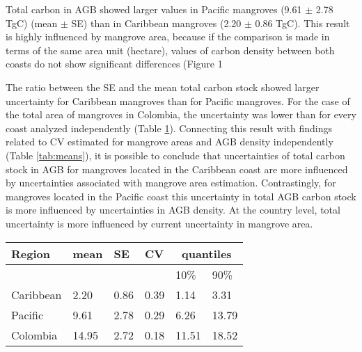\documentclass[review, authoryear]{elsarticle}   	%
\begin{document}
Total carbon in AGB showed larger values in Pacific mangroves (9.61 $\pm$ 2.78 TgC) (mean $\pm$ SE) than in Caribbean mangroves (2.20 $\pm$ 0.86 TgC). This result is highly influenced by mangrove area, because if the comparison is made in terms of the same area unit (hectare), values of carbon density between both coasts do not show significant differences (Figure 1 %


The ratio between the SE and the mean total carbon stock showed larger uncertainty for Caribbean mangroves than for Pacific mangroves. For the case of the total area of mangroves in Colombia, the uncertainty was lower than for every coast analyzed independently (Table \ref{tab:meansTotal}). Connecting this result with findings related to CV estimated for mangrove areas and AGB density independently (Table \ref{tab:means}), it is possible to conclude that uncertainties of total carbon stock in AGB for mangroves located in the Caribbean coast are more influenced by uncertainties associated with mangrove area estimation. Contrastingly, for mangroves located in the Pacific coast this uncertainty in total AGB carbon stock is more influenced by uncertainties in AGB density. At the country level, total uncertainty is more influenced by current uncertainty in mangrove area. 

\begin{table}[htbp]
   \centering
   \begin{tabular}{p{3.0cm}p{2.0cm}p{2.0cm}p{2.0cm}p{2.0cm}p{2.0cm}} %
      \toprule
       Region & mean & SE & CV & \multicolumn{2}{c}{quantiles}\\
      \midrule
      &&&&10\%&90\%\\
      Caribbean&2.20&0.86&0.39&1.14&3.31\\
      Pacific&9.61&2.78&0.29&6.26&13.79\\
      Colombia&14.95&2.72&0.18&11.51&18.52\\
            \bottomrule
   \end{tabular}
   \label{tab:meansTotal}
\end{table}

\end{document}
